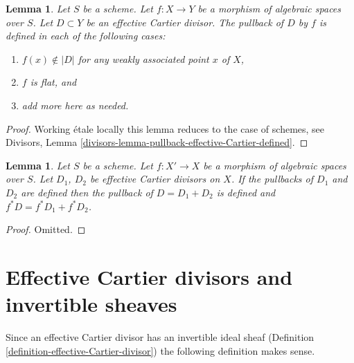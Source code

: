 \documentclass{stacks-project}
\theoremstyle{plain}
\newtheorem{lemma}[subsection]{Lemma}
\theoremstyle{definition}
\theoremstyle{remark}
\numberwithin{equation}{subsection}
\begin{document}
\begin{lemma}
\label{lemma-pullback-effective-Cartier-defined}
Let $S$ be a scheme.
Let $f : X \to Y$ be a morphism of algebraic spaces over $S$.
Let $D \subset Y$ be an effective Cartier divisor.
The pullback of $D$ by $f$ is defined in each of the following cases:
\begin{enumerate}
\item $f(x) \not \in |D|$ for any weakly associated point $x$ of $X$,
\item $f$ is flat, and
\item add more here as needed.
\end{enumerate}
\end{lemma}

\begin{proof}
Working \'etale locally this lemma reduces to the case of schemes, see
Divisors, Lemma \ref{divisors-lemma-pullback-effective-Cartier-defined}.
\end{proof}

\begin{lemma}
\label{lemma-pullback-effective-Cartier-divisors-additive}
Let $S$ be a scheme.
Let $f : X' \to X$ be a morphism of algebraic spaces over $S$.
Let $D_1$, $D_2$ be effective Cartier divisors on $X$.
If the pullbacks of $D_1$ and $D_2$ are defined then the
pullback of $D = D_1 + D_2$ is defined and
$f^*D = f^*D_1 + f^*D_2$.
\end{lemma}

\begin{proof}
Omitted.
\end{proof}




\section{Effective Cartier divisors and invertible sheaves}
\label{section-effective-Cartier-invertible}

\noindent
Since an effective Cartier divisor has an invertible ideal sheaf
(Definition \ref{definition-effective-Cartier-divisor}) the
following definition makes sense.
\end{document}
